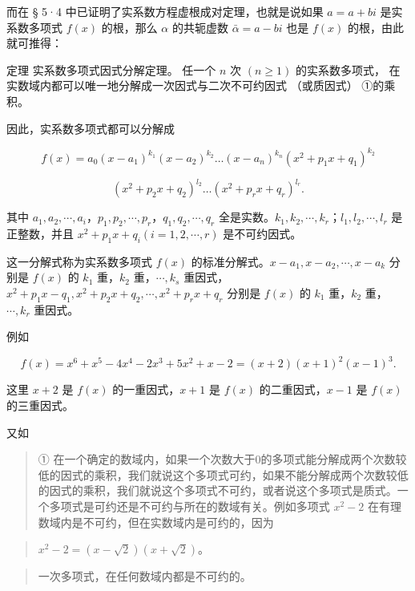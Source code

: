 而在 § 5·4 中已证明了实系数方程虚根成对定理，也就是说如果 \(a = a + bi\)
是实系数多项式 \(f(x)\) 的根，那么 \(\alpha\) 的共轭虚数
\(\bar{\alpha} = a - bi\) 也是 \(f(x)\) 的根，由此就可推得：

定理 实系数多项式因式分解定理。 任一个 \(n\) 次 \((n \geqslant 1)\)
的实系数多项式， 在实数域内都可以唯一地分解成一次因式与二次不可约因式
（或质因式） ①的乘积。

因此，实系数多项式都可以分解成

\[
f (x) = a _ {0} \left(x - a _ {1}\right) ^ {k _ {1}} \left(x - a _ {2}\right) ^ {k _ {2}} \dots \left(x - a _ {n}\right) ^ {k _ {n}} \left(x ^ {2} + p _ {1} x + q _ {1}\right) ^ {k _ {2}}
\]

\[
\left(x ^ {2} + p _ {2} x + q _ {2}\right) ^ {l _ {2}} \dots \left(x ^ {2} + p _ {r} x + q _ {r}\right) ^ {l _ {r}}.
\]

其中
\(a_1, a_2, \cdots, a_i\)，\(p_1, p_2, \cdots, p_r\)，\(q_1, q_2, \cdots, q_r\)
全是实数。\(k_1, k_2, \cdots, k_r\)；\(l_1, l_2, \cdots, l_r\)
是正整数，并且 \(x^2 + p_1 x + q_i (i=1, 2, \cdots, r)\) 是不可约因式。

这一分解式称为实系数多项式 \(f(x)\)
的标准分解式。\(x - a_1, x - a_2, \cdots, x - a_k\) 分别是 \(f(x)\) 的
\(k_1\) 重，\(k_2\) 重，\(\cdots, k_s\)
重因式，\(x^2 + p_1 x - q_1, x^2 + p_2 x + q_2, \cdots, x^2 + p_r x + q_r\)
分别是 \(f(x)\) 的 \(k_1\) 重，\(k_2\) 重，\(\cdots, k_r\) 重因式。

例如

\[
f (x) = x ^ {6} + x ^ {5} - 4 x ^ {4} - 2 x ^ {3} + 5 x ^ {2} + x - 2 = (x + 2) (x + 1) ^ {2} (x - 1) ^ {3}.
\]

这里 \(x + 2\) 是 \(f(x)\) 的一重因式，\(x + 1\) 是 \(f(x)\)
的二重因式，\(x - 1\) 是 \(f(x)\) 的三重因式。

又如

\begin{quote}
①
在一个确定的数域内，如果一个次数大于0的多项式能分解成两个次数较低的因式的乘积，我们就说这个多项式可约，如果不能分解成两个次数较低的因式的乘积，我们就说这个多项式不可约，或者说这个多项式是质式。一个多项式是可约还是不可约与所在的数域有关。例如多项式
\(x^{2}-2\) 在有理数域内是不可约，但在实数域内是可约的，因为
\end{quote}

\begin{quote}
\(x^{2} - 2 = (x - \sqrt{2})(x + \sqrt{2})\)。
\end{quote}

\begin{quote}
一次多项式，在任何数域内都是不可约的。
\end{quote}

